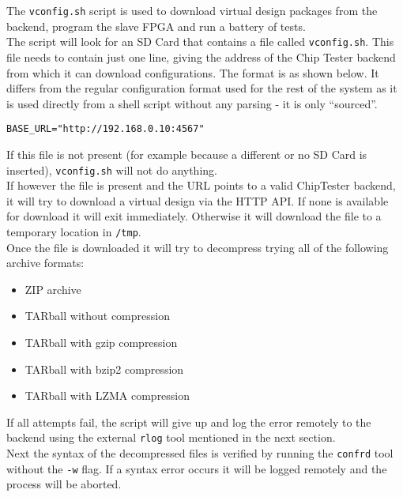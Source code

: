 The \texttt{vconfig.sh} script is used to download virtual design packages from the
backend, program the slave FPGA and run a battery of tests.
\\

The script will look for an SD Card that contains a file called \texttt{vconfig.sh}. This
file needs to contain just one line, giving the address of the Chip Tester backend from
which it can download configurations. The format is as shown below. It differs from the
regular configuration format used for the rest of the system as it is used directly from
a shell script without any parsing - it is only ``sourced''.
\lstset{basicstyle=\scriptsize\ttfamily}
\begin{lstlisting}
BASE_URL="http://192.168.0.10:4567"
\end{lstlisting}

If this file is not present (for example because a different or no SD Card is inserted),
\texttt{vconfig.sh} will not do anything.
\\

If however the file is present and the URL points to a valid ChipTester backend, it will
try to download a virtual design via the HTTP API. If none is available for download it
will exit immediately. Otherwise it will download the file to a temporary location in \texttt{/tmp}.
\\

Once the file is downloaded it will try to decompress trying all of the following archive formats:
\begin{itemize}
 \item ZIP archive
 \item TARball without compression
 \item TARball with gzip compression
 \item TARball with bzip2 compression
 \item TARball with LZMA compression 
\end{itemize}

If all attempts fail, the script will give up and log the error remotely to the backend using the
external \texttt{rlog} tool mentioned in the next section.
\\

Next the syntax of the decompressed files is verified by running the \texttt{confrd} tool
without the \texttt{-w} flag. If a syntax error occurs it will be logged remotely and the process
will be aborted.
\\

